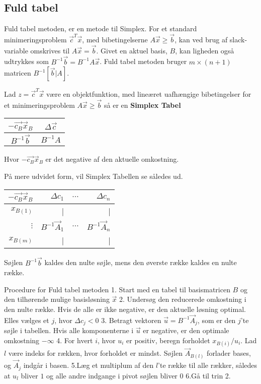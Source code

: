 \subsection{Fuld tabel}
Fuld tabel metoden, er en metode til Simplex. For et standard minimeringsproblem $\vec{c}^T\vec{x}$, med bibetingelserne $A\vec{x} \geq \vec{b}$, kan ved brug af slack-variable omskrives til $A\vec{x}=\vec{b}$. Givet en aktuel basis, $B$, kan ligheden også udtrykkes som  $B^{-1}\vec{b}=B^{-1}A\vec{x}$. Fuld tabel metoden bruger $m \times (n+1)$ matricen $B^{-1}[\vec{b}|A]$.\\

\begin{defn}
Lad $z=\vec{c}^T\vec{x}$ være en objektfunktion, med lineæret uafhængige bibetingelser for et minimeringsproblem $A\vec{x} \geq \vec{b}$ så er en \textbf{Simplex Tabel}\\
\begin{center}
\begin{tabular}{| c | c |}
  \hline
  $-\vec{c_B}\vec{x}_B$&$\Delta\vec{c}$ \\ \hline			
  $B^{-1}\vec{b}$ & $B^{-1}A$ \\ \hline
\end{tabular}
\end{center}
Hvor $-\vec{c_B}\vec{x}_B$ er det negative af den aktuelle omkostning. 
\end{defn}


På mere udvidet form, vil Simplex Tabellen se således ud.
\begin{center}
\begin{tabular}{| r|r r r|}
  \hline	
  $-\vec{c_B}\vec{x}_B$&$\Delta c_1 $ & $\dots$ &$\Delta c_n$\\ \hline	
  $x_{B(1)}$ &	| & & |\\	
  $\vdots$  & $B^{-1}\vec{A}_1$ & $\hdots$ & $B^{-1}\vec{A}_n$\\
   $x_{B(m)}$ &	| & & |\\
   \hline
\end{tabular}
\end{center}
Søjlen $B^{-1}\vec{b}$ kaldes den nulte søjle, mens den øverste række kaldes en nulte række.

\begin{pro} [label=pro:simplex,numbers=none,xleftmargin=0em] {Procedure for Fuld tabel metoden}
1. Start med en tabel til basismatricen $B$ og den tilhørende mulige basisløsning $\vec{x}$
2. Undersøg den reducerede omkostning i den nulte række. Hvis de alle er ikke negative, er den aktuelle løsning optimal. Elles vælges et $j$, hvor $\Delta c_j <0$
3. Betragt vektoren $\vec{u}=B^{-1}\vec{A}_j$, som er den $j$'te søjle i tabellen. Hvis alle komponenterne i $\vec{u}$ er negative, er den optimale omkostning $-\infty$
4. For hvert $i$, hvor $u_i$ er positiv, beregn forholdet $x_{B(i)}/u_i$. Lad $l$ være indeks for rækken, hvor forholdet er mindst. Søjlen $\vec{A}_{B(l)}$ forlader bases, og $\vec{A}_j$ indgår i basen. 
5.Læg et multiplum af den $l$'te række til alle rækker, således at $u_l$ bliver $1$ og alle andre indgange i pivot søjlen bliver $0$
6.Gå til trin 2. 
\end{pro}

